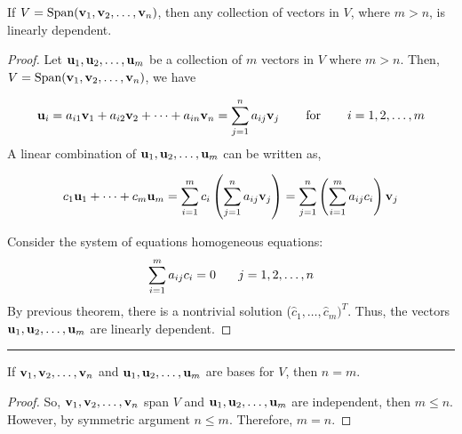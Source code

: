 \begin{theorem}
	If  $V = \text{Span}({\bf v}_1, {\bf v}_2, \dots, {\bf v}_n)$, then any collection of vectors in $V$, where $m > n$, is linearly dependent.
		
	\begin{proof}
		Let ${\bf u}_1, {\bf u}_2, \dots , {\bf u}_m$ be a collection of  $m$ vectors in $V$ where $m>n$.  Then, $V = \text{Span}({\bf v}_1, {\bf v}_2, \dots, {\bf v}_n)$, we have
		
		\[  {\bf u}_i = a_{i1} {\bf v}_1 + a_{i2} {\bf v}_2 + \cdots + a_{in} {\bf v}_n = \sum_{j=1}^n a_{ij} {\bf v}_j  \hspace{0.25in} \text{ for }  \hspace{0.25in}  i=1, 2, \dots, m 
		\]
		A linear combination of ${\bf u}_1, {\bf u}_2, \dots , {\bf u}_m$ can be written as, 
		
\[  c_1{\bf u}_1 + \cdots + c_m {\bf u}_m =  \sum_{i=1}^m c_i \left( \sum_{j=1}^n a_{ij}  {\bf v}_j     \right)  =   
\sum_{j=1}^n  \left( \sum_{i=1}^m a_{ij} c_i       \right)  {\bf v}_j 
   \]
		
		
	Consider  the system of equations homogeneous equations:
	\[  \sum_{i=1}^m a_{ij} c_i   = 0   \hspace{0.25in} j = 1, 2, \dots, n \] 	
		By previous theorem, there is a nontrivial solution ($\hat{c}_1, \dots , \hat{c}_m)^T$.  Thus, the vectors ${\bf u}_1, {\bf u}_2, \dots , {\bf u}_m$ are linearly dependent.
		
		
			\end{proof}
\end{theorem}
 
 
 
 
 
 
 
 
 
 
\rule[0.01in]{\textwidth}{0.0025in}





\begin{corollary}
	If ${\bf v}_1, {\bf v}_2, \dots , {\bf v}_n$ and ${\bf u}_1, {\bf u}_2, \dots , {\bf u}_m$ are bases for $V$, then $n=m$.
	
	\begin{proof}
		So, ${\bf v}_1, {\bf v}_2, \dots , {\bf v}_n$ span $V$ and ${\bf u}_1, {\bf u}_2, \dots , {\bf u}_m$ are independent, then $m \le n$.  However, by symmetric argument $n \le m$.  Therefore, $m=n$.
	\end{proof}
\end{corollary}


